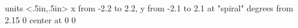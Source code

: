 %
%


\beginpicture
  \setcoordinatesystem units <.5in,.5in>
  \setplotarea x from -2.2 to 2.2, y from -2.1 to 2.1 
  at  "spiral"
  degrees from  2.15  0
    center at 0 0 
\endpicture
